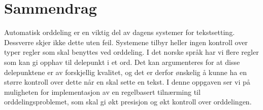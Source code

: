 \chapter{Sammendrag}

Automatisk orddeling er en viktig del av dagens systemer for tekstsetting.  Dessverre skjer ikke dette uten feil. Systemene tilbyr heller ingen kontroll over typer regler som skal benyttes ved orddeling. I det norske språk har vi flere regler som kan gi opphav til delepunkt i et ord. Det kan argumenteres for at disse delepunktene er av forskjellig kvalitet, og det er derfor ønskelig å kunne ha en større kontroll over dette når en skal sette en tekst. I denne oppgaven ser vi på muligheten for implementasjon av en regelbasert tilnærming til orddelingsproblemet, som skal gi økt presisjon og økt kontroll over orddelingen.